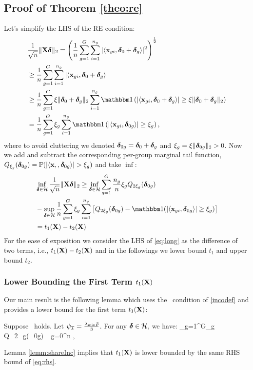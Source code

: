 \subsection{Proof of Theorem \ref{theo:re}}
Let's simplify the LHS of the RE condition:%
{\small\begin{align}
\nr 
&\frac{1}{\sqrt{n}} \norm{\X \ddelta}{2} 
= \left(\frac{1}{n} \sum_{g=1}^{G} \sum_{i=1}^{n_g} |\langle \x_{gi}, \ddelta_0 + \ddelta_g \rangle|^2\right)^{\frac{1}{2}}
\\ \nr
&\geq \frac{1}{n} \sum_{g=1}^{G} \sum_{i=1}^{n_g} |\langle \x_{gi}, \ddelta_0 + \ddelta_g \rangle| 
\\ \nr 
&\geq \frac{1}{{n}} \sum_{g=1}^{G} \xi\norm{\ddelta_0+\ddelta_g}{2}  \sum_{i=1}^{n_g} \indic \left(|\langle \x_{gi}, \ddelta_0 + \ddelta_g \rangle| \geq \xi\norm{\ddelta_0+\ddelta_g}{2}\right)
\\ \nr 
&= \frac{1}{{n}} \sum_{g=1}^{G} \xi_g  \sum_{i=1}^{n_g} \indic \left(|\langle \x_{gi}, \ddelta_{0g} \rangle| \geq \xi_g\right),
\end{align}}
where to avoid cluttering we denoted $\boldsymbol{\delta}_{0g} = \boldsymbol{\delta}_0 + \boldsymbol{\delta}_g$ and $\xi_g = \xi \|\boldsymbol{\delta}_{0g}\|_{2} > 0$.
Now we add and subtract the corresponding per-group marginal tail function, $Q_{\xi_g}(\boldsymbol{\delta}_{0g}) = \mathbb{P}(|\langle \mathbf{x}, , \boldsymbol{\delta}_{0g} \rangle| > \xi_g)$ and take $\inf$: 
\begin{align}
\nr
&\inf_{\ddelta \in \cH} \frac{1}{\sqrt{n}} \norm{\X \ddelta}{2}
\geq \inf_{\ddelta\in \cH}\sum_{g=1}^{G}  \frac{n_g}{n}  \xi_g  Q_{2 \xi_g}(\ddelta_{0g}) 
\\ \nr 
&-	\sup_{\ddelta\in \cH} \frac{1}{n} \sum_{g=1}^{G}  \xi_g  \sum_{i=1}^{n_g} \left[Q_{2 \xi_g}(\ddelta_{0g})  
- \indic (|\langle \x_{gi}, \ddelta_{0g} \rangle| \geq   \xi_g)  \right]
\\ \label{eq:long}
&= t_1(\X)-t_2(\X) 
\end{align}
For the ease of exposition we consider the LHS of \eqref{eq:long}  as the difference of two terms, i.e., $t_1(\mathbf{X}) - t_2(\mathbf{X})$ and in the followings we lower bound $t_1$ and upper bound $t_2$. 

\subsubsection{Lower Bounding the First Term $t_1(\mathbf{X})$}
Our main result is the following lemma which uses the \ds\ condition of \ref{incodef} and provides a lower bound for the first term $t_1(\mathbf{X})$:
\begin{lemma}
	\label{lemm:shareInc} 
	Suppose \ds\ holds. Let $\rinc=\frac{\lamin\ratio}{3}$. For any $\ddelta \in \cH$, we have: 
	\beq 
	\label{eq:rhs}
	\sum_{g=1}^G\xi_g Q_{2\xi_g}(\ddelta_{0g}) \geq \rinc\xi {}\sum_{g=0}^n ,
	\eeq 	
\end{lemma}
Lemma \ref{lemm:shareInc} implies that $t_1(\mathbf{X})$
is lower bounded by the same RHS bound of \eqref{eq:rhs}.

